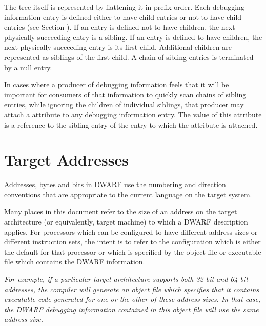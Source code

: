 The tree itself is represented
by flattening it in prefix order.
Each debugging information
entry is defined either to have child entries or not to have
child entries (see Section ).
If an entry is defined not
to have children, the next physically succeeding entry is a
sibling.
If an entry is defined to have children, the next
physically succeeding entry is its first child.
Additional
children are represented as siblings of the first child.
A chain of sibling entries is terminated by a null entry.

In cases where a producer of debugging information feels that
it\hypertarget{chap:DWATsiblingdebugginginformationentryrelationship}{}
will be important for consumers of that information to
quickly scan chains of sibling entries, while ignoring the
children of individual siblings, that producer may attach a
\DWATsiblingDEFN{} attribute
to any debugging information entry.
The value of this attribute is a reference to the sibling entry
of the entry to which the attribute is attached.

\section{Target Addresses}
\label{chap:targetaddressableunitsandaddresses}
\label{chap:targetaddresses}

Addresses, bytes and bits in DWARF use the numbering and direction
conventions that are appropriate to the current language on
the target system.

Many places in this document refer to the size of an address
on the target architecture (or equivalently, target machine)
to which a DWARF description applies. For processors which
can be configured to have different address sizes or different
instruction sets, the intent is to refer to the configuration
which is either the default for that processor or which is
specified by the object file or executable file which contains
the DWARF information.

\textit{%
For example, if a particular target architecture supports
both 32-bit and 64-bit addresses, the compiler will generate
an object file which specifies that it contains executable
code generated for one or the other of these
address sizes. In
that case, the DWARF debugging information contained in this
object file will use the same address size.}

